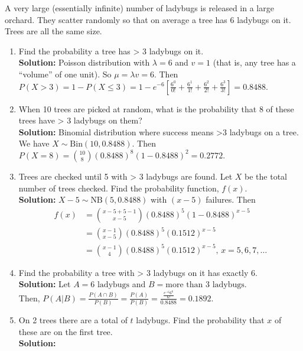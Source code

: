 \begin{example}
    A very large (essentially infinite) number of ladybugs is released in a large orchard.
    They scatter randomly so that on average a tree has 6 ladybugs on it. Trees are all the same size.
    \begin{enumerate}[label=(\alph*)]
        \item Find the probability a tree has > 3 ladybugs on it. \\
        \textbf{Solution:} Poisson distribution with $\lambda = 6$ and $v = 1$ (that is, any tree has a ``volume'' of one unit). So $\mu = \lambda v = 6$.
        Then $P(X > 3) = 1 - P(X \leq 3) = 1 - e^{-6}\left[ \frac{6^0}{0!} + \frac{6^1}{1!} + \frac{6^2}{2!} + \frac{6^3}{3!} \right] = 0.8488$.
        \item When 10 trees are picked at random, what is the probability that 8 of these trees have > 3 ladybugs on them? \\
        \textbf{Solution:} Binomial distribution where success means >3 ladybugs on a tree. We have $X \sim \text{Bin}(10, 0.8488)$.
        Then $P(X = 8) = \binom{10}{8}(0.8488)^8 (1-0.8488)^2 = 0.2772$.
        \item Trees are checked until 5 with > 3 ladybugs are found. Let $X$ be the total number of trees checked. Find the probability function, $f(x)$. \\
        \textbf{Solution:} $X-5 \sim \text{NB}(5, 0.8488)$ with $(x-5)$ failures. Then
        \begin{align*}
            f(x) &= \binom{x-5+5-1}{x-5}(0.8488)^5 (1-0.8488)^{x-5} \\
            &= \binom{x-1}{x-5}(0.8488)^5 (0.1512)^{x-5} \\
            &= \binom{x-1}{4}(0.8488)^5 (0.1512)^{x-5} \text{, $x = 5,6,7,\ldots$}
        \end{align*}
        \item Find the probability a tree with > 3 ladybugs on it has exactly 6. \\
        \textbf{Solution:} Let $A = {\text{6 ladybugs}}$ and $B = {\text{more than 3 ladybugs}}$. \\
        Then, $P(A|B) = \frac{P(A \cap B)}{P(B)} = \frac{P(A)}{P(B)} = \frac{\frac{e^{-6} 6^6}{6!}}{0.8488} = 0.1892$.
        \item On 2 trees there are a total of $t$ ladybugs. Find the probability that $x$ of these are on the first tree. \\
        \textbf{Solution:}
        \begin{align*}

\end{align*}
\end{enumerate}
\end{example}
